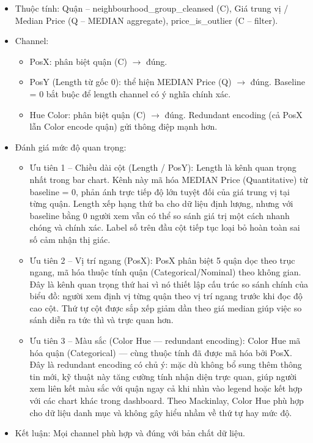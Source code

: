 \begin{itemize}
    \item Thuộc tính: Quận -- neighbourhood\_group\_cleansed (C), Giá trung vị / Median Price (Q -- MEDIAN aggregate), price\_is\_outlier (C -- filter).
    \item Channel:
    \begin{itemize}
        \item PosX: phân biệt quận (C) $\rightarrow$ đúng.
        \item PosY (Length từ gốc 0): thể hiện MEDIAN Price (Q) $\rightarrow$ đúng. Baseline = 0 bắt buộc để length channel có ý nghĩa chính xác.
        \item Hue Color: phân biệt quận (C) $\rightarrow$ đúng. Redundant encoding (cả PosX lẫn Color encode quận) gửi thông điệp mạnh hơn.
    \end{itemize}
    \item Đánh giá mức độ quan trọng:
    \begin{itemize}
        \item Ưu tiên 1 -- Chiều dài cột (Length / PosY): Length là kênh quan trọng nhất trong bar chart. Kênh này mã hóa MEDIAN Price (Quantitative) từ baseline = 0, phản ánh trực tiếp độ lớn tuyệt đối của giá trung vị tại từng quận. Length xếp hạng thứ ba cho dữ liệu định lượng, nhưng với baseline bằng 0 người xem vẫn có thể so sánh giá trị một cách nhanh chóng và chính xác. Label số trên đầu cột tiếp tục loại bỏ hoàn toàn sai số cảm nhận thị giác.
        \item Ưu tiên 2 -- Vị trí ngang (PosX): PosX phân biệt 5 quận dọc theo trục ngang, mã hóa thuộc tính quận (Categorical/Nominal) theo không gian. Đây là kênh quan trọng thứ hai vì nó thiết lập cấu trúc so sánh chính của biểu đồ: người xem định vị từng quận theo vị trí ngang trước khi đọc độ cao cột. Thứ tự cột được sắp xếp giảm dần theo giá median giúp việc so sánh diễn ra tức thì và trực quan hơn.
        \item Ưu tiên 3 -- Màu sắc (Color Hue --- redundant encoding): Color Hue mã hóa quận (Categorical) --- cùng thuộc tính đã được mã hóa bởi PosX. Đây là redundant encoding có chủ ý: mặc dù không bổ sung thêm thông tin mới, kỹ thuật này tăng cường tính nhận diện trực quan, giúp người xem liên kết màu sắc với quận ngay cả khi nhìn vào legend hoặc kết hợp với các chart khác trong dashboard. Theo Mackinlay, Color Hue phù hợp cho dữ liệu danh mục và không gây hiểu nhầm về thứ tự hay mức độ.
    \end{itemize}
    \item Kết luận: Mọi channel phù hợp và đúng với bản chất dữ liệu.
\end{itemize}

